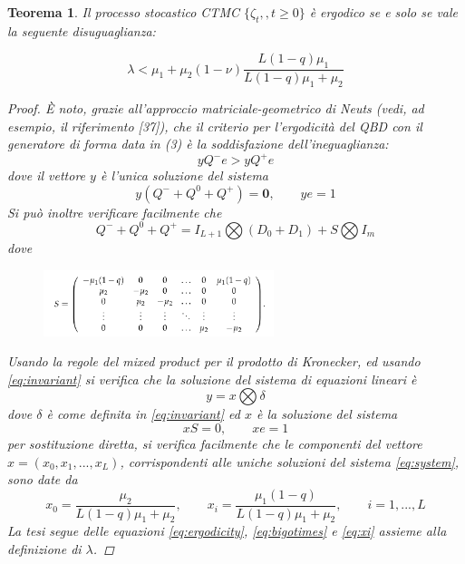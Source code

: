 \documentclass[11pt]{article}
\newtheorem{teorema}{Teorema}[section]
\begin{document}
\begin{teorema}
    Il processo stocastico CTMC $\{\zeta_t,,t\geq 0\}$ è ergodico se e solo se vale la seguente disuguaglianza:

    \begin{equation}\label{eq:ergodicity}
        \lambda < \mu_1 + \mu_2(1 - \nu) \frac{L(1-q)\mu_1}{L(1-q)\mu_1 + \mu_2}
    \end{equation}

    \begin{proof}
        È noto, grazie all'approccio matriciale-geometrico di Neuts (vedi, ad esempio, il riferimento [37]), che il criterio per l'ergodicità del QBD con il generatore di forma data in (3) è la soddisfazione dell'ineguaglianza:
        \begin{equation}\label{eq:ergodicity}
            y Q^- e > y Q^+e
        \end{equation}
        dove il vettore $y$ è l'unica soluzione del sistema
        \begin{equation}
            y(Q^- + Q^0 + Q^+) = \textbf{0}, \qquad ye = 1
        \end{equation}
        Si può inoltre verificare facilmente che
        \begin{equation}\label{eq:bigotimes}
            Q^- + Q^0 + Q^+ = I_{L+1} \bigotimes (D_0 + D_1) + S \bigotimes I_{m}
        \end{equation}
        dove
        \begin{figure}[h!]
            \centering
            \includegraphics[width=0.6\textwidth]{lLnSEzP.png}
        \end{figure}
        Usando la regole del mixed product per il prodotto di Kronecker, ed usando \ref{eq:invariant} si verifica che la soluzione del sistema di equazioni lineari è
        \begin{equation}
            y = x \bigotimes \delta
        \end{equation}
        dove $\delta$ è come definita in \ref{eq:invariant} ed $x$ è la soluzione del sistema
        \begin{equation}\label{eq:system}
            xS = 0, \qquad xe = 1
        \end{equation}
        per sostituzione diretta, si verifica facilmente che le componenti del vettore $x = (x_0, x_1, ... , x_L)$, corrispondenti alle uniche soluzioni del sistema \ref{eq:system}, sono date da
        \begin{equation}\label{eq:xi}
            x_0 = \frac{\mu_2}{L(1-q)\mu_1 + \mu_2}, \qquad x_i = \frac{\mu_1(1-q)}{L(1-q)\mu_1 + \mu_2}, \qquad i = 1, ..., L
        \end{equation}
        La tesi segue delle equazioni \ref{eq:ergodicity}, \ref{eq:bigotimes} e \ref{eq:xi} assieme alla definizione di $\lambda$.
    \end{proof}

\end{teorema}
\end{document}
